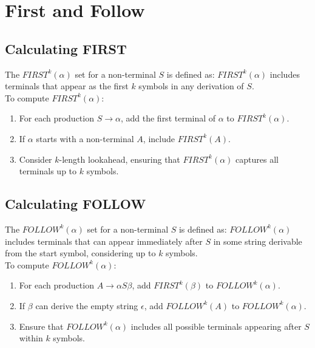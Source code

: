 
\section{First and Follow}
\subsection{Calculating FIRST}
The $FIRST^k(\alpha)$ set for a non-terminal $S$ is defined as:
    $FIRST^k(\alpha)$ includes terminals that appear as the first $k$ symbols in any derivation of $S$.\\
    To compute $FIRST^k(\alpha)$:
    \begin{enumerate}
        \item For each production $S \to \alpha$, add the first terminal of $\alpha$ to $FIRST^k(\alpha)$.
        \item If $\alpha$ starts with a non-terminal $A$, include $FIRST^k(A)$.
        \item Consider $k$-length lookahead, ensuring that $FIRST^k(\alpha)$ captures all terminals up to $k$ symbols.
    \end{enumerate}

\subsection{Calculating FOLLOW}
The $FOLLOW^k(\alpha)$ set for a non-terminal $S$ is defined as:
    $FOLLOW^k(\alpha)$ includes terminals that can appear immediately after $S$ in some string derivable from the start symbol, considering up to $k$ symbols.\\
    To compute $FOLLOW^k(\alpha)$:
    \begin{enumerate}
        \item For each production $A \to \alpha S \beta$, add $FIRST^k(\beta)$ to $FOLLOW^k(\alpha)$.
        \item If $\beta$ can derive the empty string $\epsilon$, add $FOLLOW^k(A)$ to $FOLLOW^k(\alpha)$.
        \item Ensure that $FOLLOW^k(\alpha)$ includes all possible terminals appearing after $S$ within $k$ symbols.
    \end{enumerate}


